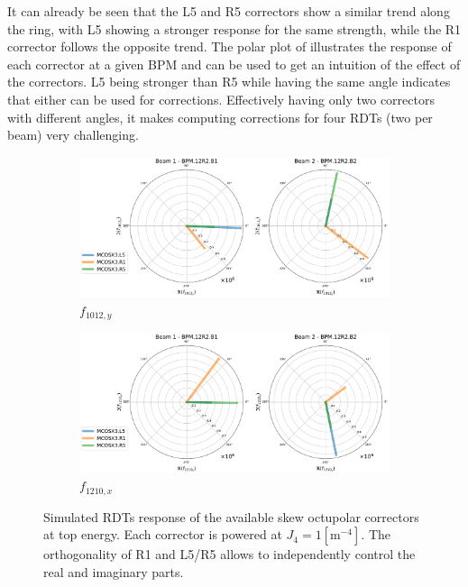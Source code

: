 It can already be seen that the L5 and R5 correctors show a similar trend along the ring, with L5
showing a stronger response for the same strength, while the R1 corrector follows the opposite
trend. The polar plot of 
illustrates the response of each corrector at a given BPM and can be used to get an intuition of the
effect of the correctors. L5 being stronger than R5 while having the same angle indicates that
either can be used for corrections. Effectively having only two correctors with different angles, it
makes computing corrections for four RDTs (two per beam) very challenging.

\begin{figure}[!htb]
    \centering
    \begin{subfigure}{0.7\textwidth}
        \includegraphics[width=\textwidth]{./images/orthogonal_a4_inj_f1012_y.pdf}
        \caption{$f_{1012,y}$}
    \end{subfigure}
    \par\bigskip 
    \begin{subfigure}{0.7\textwidth}
        \includegraphics[width=\textwidth]{./images/orthogonal_a4_inj_f1210_x.pdf}
        \caption{$f_{1210,x}$}
    \end{subfigure}
    \caption{Simulated RDTs response of the available skew octupolar correctors at top energy.  Each
    corrector is powered at $J_4 = 1 [\text{m}^{-4}]$. The orthogonality of R1 and L5/R5 allows to
    independently control the real and imaginary parts.}
    \label{fig:skew_octupolar:response_correctors_polar}
\end{figure}


